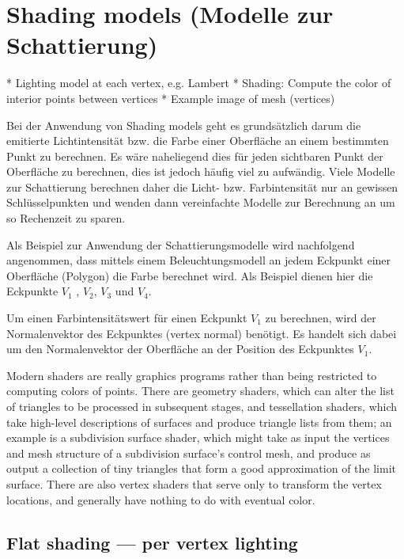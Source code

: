 
\section{Shading models (Modelle zur Schattierung)}
\label{sec:shading}

* Lighting model at each vertex, e.g. Lambert
* Shading: Compute the color of interior points between vertices
* Example image of mesh (vertices)

Bei der Anwendung von Shading models geht es grundsätzlich darum die emitierte
Lichtintensität bzw. die Farbe einer Oberfläche an einem bestimmten Punkt zu
berechnen. Es wäre naheliegend dies für jeden sichtbaren Punkt der Oberfläche
zu berechnen, dies ist jedoch häufig viel zu aufwändig. Viele Modelle zur
Schattierung berechnen daher die Licht- bzw. Farbintensität nur an gewissen
Schlüsselpunkten und wenden dann vereinfachte Modelle zur Berechnung an um so
Rechenzeit zu sparen.

Als Beispiel zur Anwendung der Schattierungsmodelle wird nachfolgend
angenommen, dass mittels einem Beleuchtungsmodell an jedem Eckpunkt einer
Oberfläche (Polygon) die Farbe berechnet wird. Als Beispiel dienen hier die
Eckpunkte $V_{1}$ , $V_{2}$, $V_{3}$ und $V_{4}$.

Um einen Farbintensitätswert für einen Eckpunkt $V_{1}$ zu berechnen, wird der
Normalenvektor des Eckpunktes (vertex normal) benötigt. Es handelt sich dabei
um den Normalenvektor der Oberfläche an der Position des Eckpunktes $V_{1}$.

Modern shaders are really graphics programs rather than being restricted to
computing colors of points. There are geometry shaders, which can alter the
list of triangles to be processed in subsequent stages, and tessellation
shaders, which take high-level descriptions of surfaces and produce triangle
lists from them; an example is a subdivision surface shader, which might take
as input the vertices and mesh structure of a subdivision surface’s control
mesh, and produce as output a collection of tiny triangles that form a good
approximation of the limit surface. There are also vertex shaders that serve
only to transform the vertex locations, and generally have nothing to do with
eventual color.

\subsection{Flat shading --- per vertex lighting}
\label{subsec:flat_shading}

